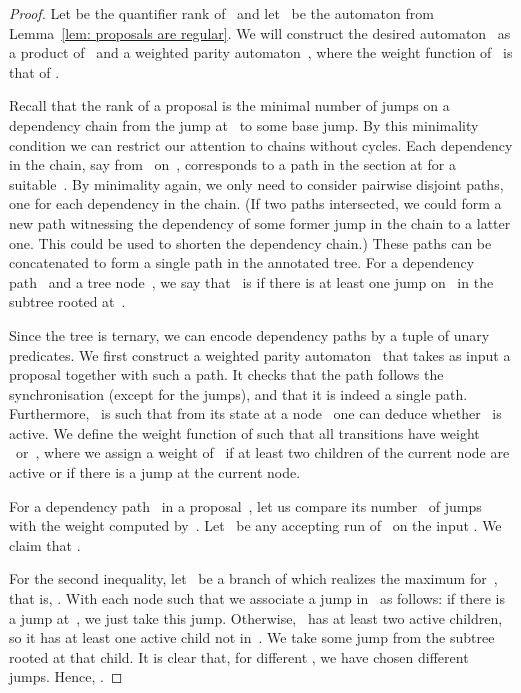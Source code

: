 \documentclass{LMCS}
\begin{document}
\begin{proof}
Let  be the quantifier rank of~
and let ~be the automaton from Lemma~\ref{lem: proposals are regular}.
We will construct the desired automaton~
as a product of~ and a weighted parity automaton~,
where the weight function of~ is that of .

Recall that the rank of a proposal 
is the minimal number of jumps
on a dependency chain from the jump at~ to some base jump.
By this minimality condition
we can restrict our attention to chains without cycles.
Each dependency in the chain, say from~ on~,
corresponds to a path in the section at  for a suitable~.
By minimality again, we only need to consider
pairwise disjoint paths, one for each dependency in the chain.
(If two paths intersected, we could form a new path witnessing the dependency
of some former jump in the chain to a latter one. This could be used to shorten
the dependency chain.)
These paths can be concatenated to form a single path in the annotated tree.
For a dependency path~ and a tree node~,
we say that ~is 
if there is at least one jump on~ in the subtree rooted at~.

Since the tree is ternary, we can encode dependency paths by a tuple of unary predicates.
We first construct a weighted parity automaton~ that takes as input
a proposal together with such a path.
It checks that the path follows the synchronisation (except for the jumps),
and that it is indeed a single path.
Furthermore, ~is such that from its state at a node~
one can deduce whether ~is active.
We define the weight function of  such
that all transitions have weight ~or~, where we assign
a weight of~ if at least two children of the current node are active
or if there is a jump at the current node.

For a dependency path~ in a proposal~,
let us compare its number~ of jumps
with the weight computed by~.
Let ~be any accepting run of~
on the input .
We claim that .

For the second inequality,
let ~be a branch of  which realizes the maximum for~,
that is, .
With each node  such that 
we associate a jump in~ as follows\?:
if there is a jump at~, we just take this jump.
Otherwise, ~has at least two active children,
so it has at least one active child not in~.
We take some jump from the subtree rooted at that child.
It is clear that, for different , we have chosen different jumps.
Hence, .


\end{proof}
\end{document}
